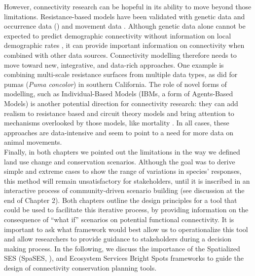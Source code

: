 \documentclass[12pt,Bold,TexShade]{thesis/mcgilletdclass}
\begin{document}
{However, connectivity research can be hopeful in its ability to move beyond those limitations. Resistance-based models have been validated with genetic data \citep{marrotte_landscape_2014} and occurrence data (\cite{gray_landscape_2016}) and movement data \citep{lapoint_animal_2013}. Although genetic data alone cannot be expected to predict demographic connectivity without information on local demographic rates \citep{lowe_what_2010}, it can provide important information on connectivity when combined with other data sources. Connectivity modelling therefore needs to move toward new, integrative, and data-rich approaches. One example is combining multi-scale resistance surfaces from multiple data types, as \cite{zeller_multi-level_2017} did for pumas (\textit{Puma concolor}) in southern California. The role of novel forms of modelling, such as Individual-Based Models (IBMs, a form of Agents-Based Models) is another potential direction for connectivity research: they can add realism to resistance based and circuit theory models and bring attention to mechanisms overlooked by those models, like mortality \citep{day_individual-based_2020}. In all cases, these approaches are data-intensive and seem to point to a need for more data on animal movements. \\

Finally, in both chapters we pointed out the limitations in the way we defined land use change and conservation scenarios. Although the goal was to derive simple and extreme cases to show the range of variations in species’ responses, this method will remain unsatisfactory for stakeholders, until it is inscribed in an interactive process of community-driven scenario building (see discussion at the  end of Chapter 2). Both chapters outline the design principles for a tool that could be used to facilitate this iterative process, by providing information on the consequence of “what if” scenarios on potential functional connectivity. It is important to ask what framework would best allow us to operationalize this tool and allow researchers to provide guidance to stakeholders during a decision making process. In the following, we discuss the importance of the Spatialized SES (SpaSES, \cite{williamson_spatially_2018}), and Ecosystem Services Bright Spots \citep{frei_bright_2018} frameworks to guide the design of connectivity conservation planning tools. \\

}
\end{document}
